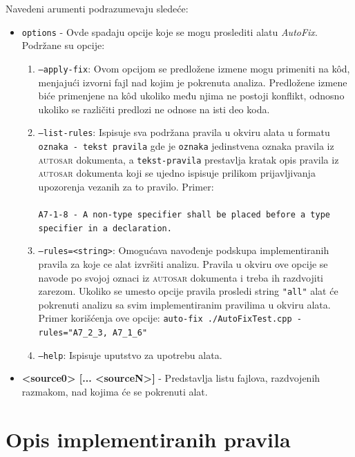 \documentclass[12pt,oneside]{memoir}
\begin{document}
Navedeni arumenti podrazumevaju sledeće:
\begin{itemize}
  \item \texttt{options} - Ovde spadaju opcije koje se mogu proslediti alatu \textit{AutoFix}. Podr\v{z}ane su opcije:
  \begin{enumerate}
    \item \texttt{--apply-fix}: Ovom opcijom se predlo\v{z}ene izmene mogu primeniti na k\^{o}d, menjaju\'{c}i izvorni fajl nad kojim je pokrenuta analiza.
    Predlo\v{z}ene izmene bi\'{c}e primenjene na k\^{o}d ukoliko među njima ne postoji konflikt, odnosno ukoliko se razli\v{c}iti predlozi ne odnose na isti deo koda.
    \item \texttt{--list-rules}: Ispisuje sva podr\v{z}ana pravila u okviru alata u formatu \texttt{oznaka - tekst pravila} gde je \texttt{oznaka} jedinstvena oznaka pravila iz \textsc{autosar} dokumenta, a \texttt{tekst-pravila} prestavlja kratak opis pravila iz \textsc{autosar} dokumenta koji se ujedno ispisuje prilikom prijavljivanja upozorenja vezanih za to pravilo. Primer: \\ \\
  \texttt{A7-1-8 - A non-type specifier shall be placed before a type specifier in a declaration.} \\
    \item \texttt{--rules=<string>}: Omogu\'{c}ava navođenje podskupa implementiranih pravila za koje ce alat izvr\v{s}iti analizu. Pravila u okviru ove opcije
    se navode po svojoj oznaci iz \textsc{autosar} dokumenta i treba ih razdvojiti zarezom. Ukoliko se umesto opcije pravila prosledi string \texttt{"all"} alat \'{c}e pokrenuti
    analizu sa svim implementiranim pravilima u okviru alata. Primer kori\v{s}\'{c}enja ove opcije: \newline\newline
    \texttt{auto-fix ./AutoFixTest.cpp -rules="A7\_2\_3, A7\_1\_6"} \\
    \item \texttt{--help}: Ispisuje uputstvo za upotrebu alata.
  \end{enumerate}

\item \textbf{<source0> [... <sourceN>]} - Predstavlja listu fajlova, razdvojenih razmakom, nad kojima \'{c}e se pokrenuti alat.

\end{itemize}

\section{Opis implementiranih pravila}
\end{document}
